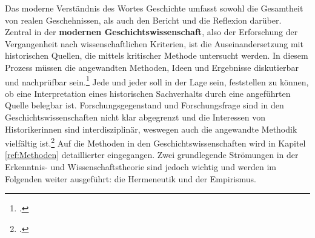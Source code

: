 \documentclass[12pt,a4paper]{article}
\begin{document}
Das moderne Verständnis des Wortes Geschichte umfasst sowohl die Gesamtheit von realen Geschehnissen, als auch den Bericht und die Reflexion darüber. Zentral in der \textbf{modernen Geschichtswissenschaft}, also der Erforschung der Vergangenheit nach wissenschaftlichen Kriterien, ist die Auseinandersetzung mit historischen Quellen, die mittels kritischer Methode untersucht werden. In diesem Prozess müssen die angewandten Methoden, Ideen und Ergebnisse diskutierbar und nachprüfbar sein.\footcite[][S.13-32]{demand2011philosophie} Jede und jeder soll in der Lage sein, feststellen zu können, ob eine Interpretation eines historischen Sachverhalts durch eine angeführten Quelle belegbar ist. Forschungsgegenstand und Forschungsfrage sind in den Geschichtswissenschaften nicht klar abgegrenzt und die Interessen von Historikerinnen sind interdisziplinär, weswegen auch die angewandte Methodik vielfältig ist.\footcite[][S.13]{reiche2014verfahren} Auf die Methoden in den Geschichtswissenschaften wird in Kapitel \ref{ref:Methoden} detaillierter eingegangen.
Zwei grundlegende Strömungen in der Erkenntnis- und Wissenschaftstheorie sind jedoch wichtig und werden im Folgenden weiter ausgeführt: die Hermeneutik und der Empirismus.


\end{document}
